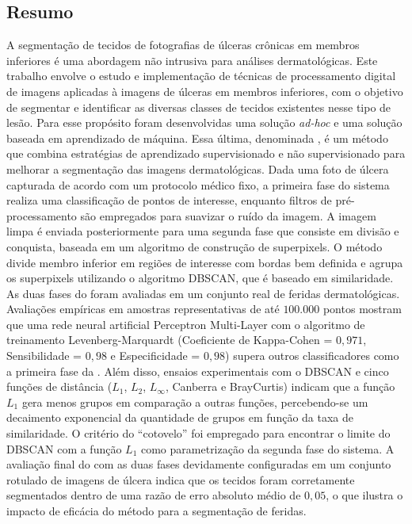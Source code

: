 \newpage
\blankpage

\begin{center}
    \section*{Resumo}
\end{center}

\noindent 
A segmentação de tecidos de fotografias de úlceras crônicas em membros inferiores é uma abordagem não intrusiva para análises dermatológicas.
Este trabalho envolve o estudo e implementação de técnicas de processamento digital de imagens aplicadas à imagens de úlceras em membros inferiores, com o objetivo de segmentar e identificar as diversas classes de tecidos existentes nesse tipo de lesão.
Para esse propósito foram desenvolvidas uma solução \textit{ad-hoc} e uma solução baseada em aprendizado de máquina.
Essa última, denominada \system, é um método que combina estratégias de aprendizado supervisionado e não supervisionado para melhorar a segmentação das imagens dermatológicas.
Dada uma foto de úlcera capturada de acordo com um protocolo médico fixo, a primeira fase do sistema realiza uma classificação de pontos de interesse, enquanto filtros de pré-processamento são empregados para suavizar o ruído da imagem.
A imagem limpa é enviada posteriormente para uma segunda fase que consiste em divisão e conquista, baseada em um algoritmo de construção de superpixels.
O método \system divide membro inferior em regiões de interesse com bordas bem definida e agrupa os superpixels utilizando o algoritmo DBSCAN, que é baseado em similaridade.
As duas fases do \system foram avaliadas em um conjunto real de feridas dermatológicas. 
Avaliações empíricas em amostras representativas de até $ 100.000$ pontos mostram que uma rede neural artificial Perceptron Multi-Layer com o algoritmo de treinamento Levenberg-Marquardt (Coeficiente de Kappa-Cohen = $ 0,971 $, Sensibilidade = $ 0,98 $ e Especificidade = $ 0,98 $) supera outros classificadores como a primeira fase da \system.
Além disso, ensaios experimentais com o DBSCAN e cinco funções de distância ($ L_1 $, $ L_2 $, $ L_ \infty $, Canberra e BrayCurtis) indicam que a função $ L_1 $ gera menos grupos em comparação a outras funções, percebendo-se um decaimento exponencial da quantidade de grupos em função da taxa de similaridade.
O critério do ``cotovelo'' foi empregado para encontrar o limite do DBSCAN com a função $ L_1 $ como parametrização da segunda fase do sistema.
A avaliação final do \system com as duas fases devidamente configuradas em um conjunto rotulado de imagens de úlcera indica que os tecidos foram corretamente segmentados dentro de uma razão de erro absoluto médio de $0,05$, o que ilustra o impacto de eficácia do método \system para a segmentação de feridas.

